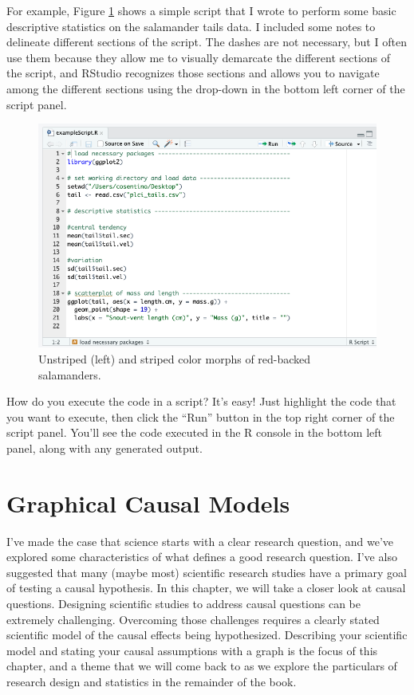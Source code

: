 \documentclass[
]{book}
\begin{document}
For example, Figure \ref{fig:c3f4} shows a simple script that I wrote to perform some basic descriptive statistics on the salamander tails data. I included some notes to delineate different sections of the script. The dashes are not necessary, but I often use them because they allow me to visually demarcate the different sections of the script, and RStudio recognizes those sections and allows you to navigate among the different sections using the drop-down in the bottom left corner of the script panel.

\begin{figure}
\includegraphics[width=0.9\linewidth]{images/03_exampleScript} \caption{Unstriped (left) and striped color morphs of red-backed salamanders.}\label{fig:c3f4}
\end{figure}

How do you execute the code in a script? It's easy! Just highlight the code that you want to execute, then click the ``Run'' button in the top right corner of the script panel. You'll see the code executed in the R console in the bottom left panel, along with any generated output.

\chapter{Graphical Causal Models}\label{graphical-causal-models}

I've made the case that science starts with a clear research question, and we've explored some characteristics of what defines a good research question. I've also suggested that many (maybe most) scientific research studies have a primary goal of testing a causal hypothesis. In this chapter, we will take a closer look at causal questions. Designing scientific studies to address causal questions can be extremely challenging. Overcoming those challenges requires a clearly stated scientific model of the causal effects being hypothesized. Describing your scientific model and stating your causal assumptions with a graph is the focus of this chapter, and a theme that we will come back to as we explore the particulars of research design and statistics in the remainder of the book.
\end{document}
